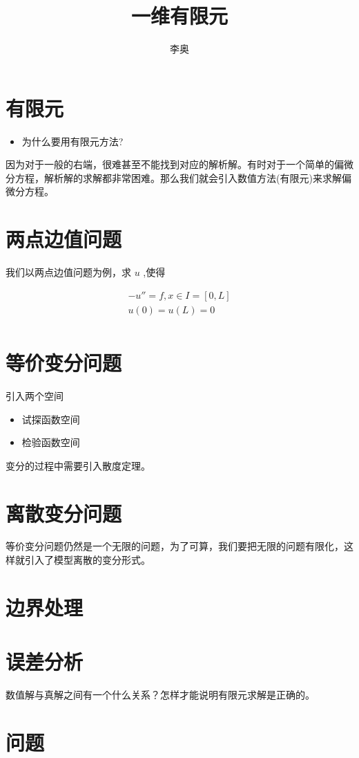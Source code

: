 \documentclass{article}
\begin{document}
\title{一维有限元}
\author{李奥}
\date{\chntoday}
\maketitle

\section{有限元}
\begin{itemize}
    \item 为什么要用有限元方法?
\end{itemize}
因为对于一般的右端，很难甚至不能找到对应的解析解。有时对于一个简单的偏微分方程，解析解的求解都非常困难。那么我们就会引入数值方法(有限元)来求解偏微分方程。

\section{两点边值问题}
我们以两点边值问题为例，求 $u$ ,使得

\begin{equation}
	\begin{aligned}
	-u'' = f, x \in I = [0, L] \\
		u(0) = u(L) = 0 \\
	\end{aligned}
\end{equation}

\section{等价变分问题}
引入两个空间

\begin{itemize}
    \item 试探函数空间
    \item 检验函数空间
\end{itemize}

变分的过程中需要引入散度定理。

\section{离散变分问题}

等价变分问题仍然是一个无限的问题，为了可算，我们要把无限的问题有限化，这样就引入了模型离散的变分形式。

\section{边界处理}
\section{误差分析}
数值解与真解之间有一个什么关系？怎样才能说明有限元求解是正确的。


\section{问题}

\cite{fem_2010}


\end{document}
